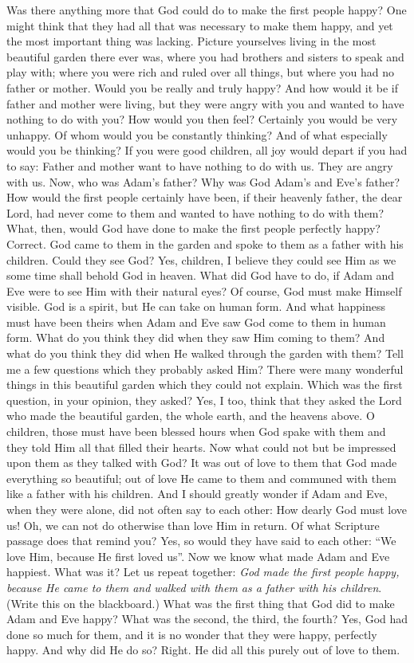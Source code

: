 Was there anything more that God could do to make the first people happy? One might think that they had all that was necessary to make them happy, and yet the most important thing was lacking. Picture yourselves living in the most beautiful garden there ever was, where you had brothers and sisters to speak and play with; where you were rich and ruled over all things, but where you had no father or mother. Would you be really and truly happy? And how would it be if father and mother were living, but they were angry with you and wanted to have nothing to do with you? How would you then feel? Certainly you would be very unhappy. Of whom would you be constantly thinking? And of what especially would you be thinking? If you were good children, all joy would depart if you had to say: Father and mother
want to have nothing to do with us. They are angry with us. Now, who was Adam’s father? Why was God Adam’s and Eve’s father? How would the first people certainly have been, if their heavenly father, the dear Lord, had never come to them and wanted to have nothing to do with them? What, then, would God have done to make the first people perfectly happy? Correct. God came to them in the garden and spoke to them as a father with his children. Could they see God? Yes, children, I believe they could see Him as we some time shall behold God in heaven. What did God have to do, if Adam and Eve were to see Him with their natural eyes? Of course, God must make Himself visible. God is a spirit, but He can take on human form. And what happiness must have been theirs when Adam and Eve saw God come to them in human form. What do you think they did when they saw Him coming to them? And what do you think they did when He walked through the garden with them? Tell me a few questions which they probably asked Him? There were many wonderful things in this beautiful garden which they could not explain. Which was the first question, in your opinion, they asked? Yes, I too, think that they asked the Lord who made the beautiful garden, the whole earth, and the heavens above. O children, those must have been blessed hours when God spake with them and they told Him all that filled their hearts. Now what could not but be impressed upon them as they talked with God? It was out of love to them that God made everything so beautiful; out of love He came to them and communed with them like a father with his children. And I should greatly wonder if Adam and Eve, when they were alone, did not often say to each other: How dearly God must love us! Oh, we can not do otherwise than love Him in return. Of what Scripture passage does that remind you? Yes, so would they have said to each other: “We love Him, because He first loved us”. Now we know what made Adam and Eve happiest. What was it? Let us repeat together: \emph{God made the first people happy, because He came to them and walked with them as a father with his children}. (Write this on the blackboard.) What was the first thing that God did to make Adam and Eve happy? What was the second, the third, the fourth? Yes, God had done so much for them, and it is no wonder that they were happy, perfectly happy. And why did He do so? Right. He did all this purely out of love to them.

